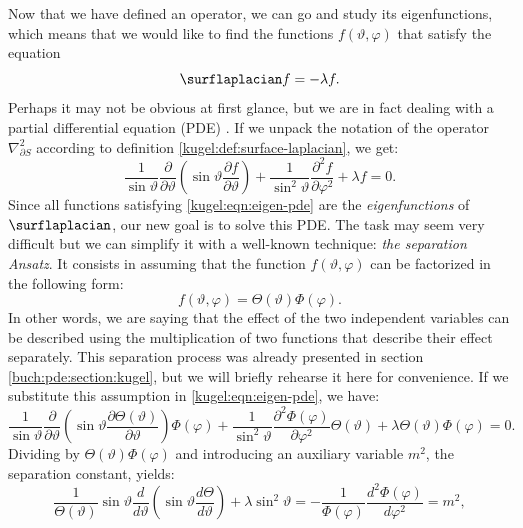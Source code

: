 Now that we have defined an operator, we can go and study its eigenfunctions,
which means that we would like to find the functions $f(\vartheta, \varphi)$
that satisfy the equation
\begin{equation} \label{kuvel:eqn:eigen}
    \surflaplacian f = -\lambda f.
\end{equation}
Perhaps it may not be obvious at first glance, but we are in fact dealing with a
partial differential equation (PDE) . If we
unpack the notation of the operator $\nabla^2_{\partial S}$ according to
definition
\ref{kugel:def:surface-laplacian}, we get:
\begin{equation} \label{kugel:eqn:eigen-pde}
    \frac{1}{\sin\vartheta} \frac{\partial}{\partial \vartheta} \left(
      \sin\vartheta \frac{\partial f}{\partial\vartheta}
    \right)
    + \frac{1}{\sin^2 \vartheta} \frac{\partial^2 f}{\partial\varphi^2}
    + \lambda f = 0.
\end{equation}
Since all functions satisfying \eqref{kugel:eqn:eigen-pde} are the
\emph{eigenfunctions} of $\surflaplacian$, our new goal is to solve this PDE.
The task may seem very difficult but we can simplify it with a well-known
technique: \emph{the separation Ansatz}. It consists in assuming that the
function $f(\vartheta, \varphi)$ can be factorized in the following form:
\begin{equation}
    f(\vartheta, \varphi) = \Theta(\vartheta)\Phi(\varphi). 
\end{equation}
In other words, we are saying that the effect of the two independent variables
can be described using the multiplication of two functions that describe their
effect separately. This separation process was already presented in section
\ref{buch:pde:section:kugel}, but we will briefly rehearse it here for
convenience. If we substitute this assumption in
\eqref{kugel:eqn:eigen-pde}, we have:
\begin{equation*}
    \frac{1}{\sin\vartheta} \frac{\partial}{\partial \vartheta} \left(
      \sin\vartheta \frac{\partial  \Theta(\vartheta)}{\partial\vartheta}
    \right) \Phi(\varphi)
    + \frac{1}{\sin^2 \vartheta}
      \frac{\partial^2 \Phi(\varphi)}{\partial\varphi^2}
      \Theta(\vartheta)
    + \lambda \Theta(\vartheta)\Phi(\varphi) = 0.
\end{equation*}
Dividing by $\Theta(\vartheta)\Phi(\varphi)$ and introducing an auxiliary
variable $m^2$, the separation constant, yields:
\begin{equation*}
  \frac{1}{\Theta(\vartheta)}\sin \vartheta \frac{d}{d \vartheta} \left(
    \sin \vartheta \frac{d \Theta}{d \vartheta}
  \right)
  + \lambda \sin^2 \vartheta
  = -\frac{1}{\Phi(\varphi)} \frac{d^2\Phi(\varphi)}{d\varphi^2}
  = m^2,
\end{equation*}
